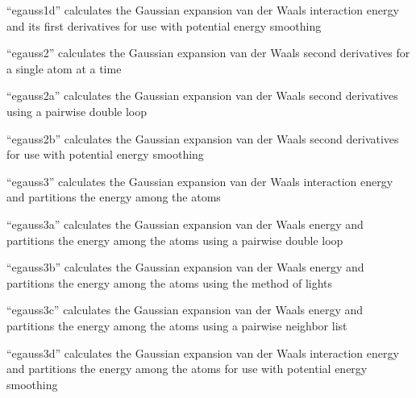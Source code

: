 \documentclass[letterpaper,11pt,english]{sphinxmanual}
\begin{document}
\sphinxAtStartPar
{}

\sphinxAtStartPar
“egauss1d” calculates the Gaussian expansion van der Waals interaction energy and its first derivatives for use with potential energy smoothing

\sphinxAtStartPar
{}

\sphinxAtStartPar
“egauss2” calculates the Gaussian expansion van der Waals second derivatives for a single atom at a time

\sphinxAtStartPar
{}

\sphinxAtStartPar
“egauss2a” calculates the Gaussian expansion van der Waals second derivatives using a pairwise double loop

\sphinxAtStartPar
{}

\sphinxAtStartPar
“egauss2b” calculates the Gaussian expansion van der Waals second derivatives for use with potential energy smoothing

\sphinxAtStartPar
{}

\sphinxAtStartPar
“egauss3” calculates the Gaussian expansion van der Waals interaction energy and partitions the energy among the atoms

\sphinxAtStartPar
{}

\sphinxAtStartPar
“egauss3a” calculates the Gaussian expansion van der Waals energy and partitions the energy among the atoms using a pairwise double loop

\sphinxAtStartPar
{}

\sphinxAtStartPar
“egauss3b” calculates the Gaussian expansion van der Waals energy and partitions the energy among the atoms using the method of lights

\sphinxAtStartPar
{}

\sphinxAtStartPar
“egauss3c” calculates the Gaussian expansion van der Waals energy and partitions the energy among the atoms using a pairwise neighbor list

\sphinxAtStartPar
{}

\sphinxAtStartPar
“egauss3d” calculates the Gaussian expansion van der Waals interaction energy and partitions the energy among the atoms for use with potential energy smoothing

\sphinxAtStartPar
{}
\end{document}

